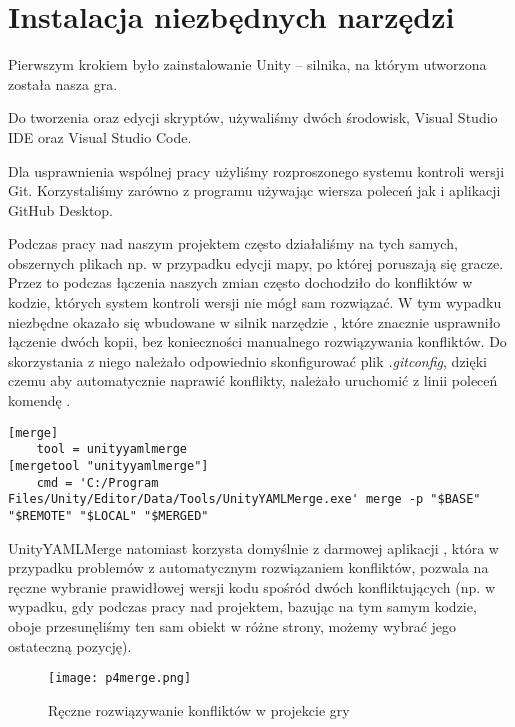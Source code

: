 \section{Instalacja niezbędnych narzędzi}
Pierwszym krokiem było zainstalowanie Unity – silnika, na którym utworzona została nasza gra. 

Do tworzenia oraz edycji skryptów, używaliśmy dwóch środowisk, Visual Studio IDE oraz Visual Studio Code. 

Dla usprawnienia wspólnej pracy użyliśmy rozproszonego systemu kontroli wersji Git. Korzystaliśmy zarówno z programu używając wiersza poleceń jak i aplikacji GitHub Desktop.

Podczas pracy nad naszym projektem często działaliśmy na tych samych, obszernych plikach np. w przypadku edycji mapy, po której poruszają się gracze. 
Przez to podczas łączenia naszych zmian często dochodziło do konfliktów w kodzie, których system kontroli wersji nie mógł sam rozwiązać. 
W tym wypadku niezbędne okazało się wbudowane w silnik narzędzie , które znacznie usprawniło łączenie dwóch kopii, bez konieczności manualnego rozwiązywania konfliktów. Do skorzystania z niego należało odpowiednio skonfigurować plik \textit{.gitconfig}, dzięki czemu aby automatycznie naprawić konflikty, należało uruchomić z linii poleceń komendę .
\\
\begin{lstlisting}[caption={Zawartość pliku .gitconfig po konfiguracji narzędzia UnityYAMLMerge}]
[merge]
	tool = unityyamlmerge
[mergetool "unityyamlmerge"]
	cmd = 'C:/Program Files/Unity/Editor/Data/Tools/UnityYAMLMerge.exe' merge -p "$BASE" "$REMOTE" "$LOCAL" "$MERGED"
\end{lstlisting}

UnityYAMLMerge natomiast korzysta domyślnie z darmowej aplikacji , która w przypadku problemów z automatycznym rozwiązaniem konfliktów, pozwala na ręczne wybranie prawidłowej wersji kodu spośród dwóch konfliktujących (np. w wypadku, gdy podczas pracy nad projektem, bazując na tym samym kodzie, oboje przesunęliśmy ten sam obiekt w różne strony, możemy wybrać jego ostateczną pozycję).

\begin{figure}[H]
\texttt{[image: p4merge.png]}
\caption{Ręczne rozwiązywanie konfliktów w projekcie gry}
\end{figure}